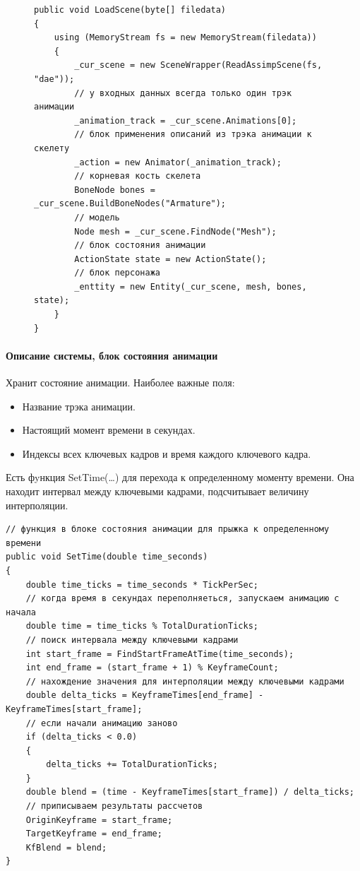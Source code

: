 \begin{scriptsize}
\begin{figure}
\begin{verbatim}
public void LoadScene(byte[] filedata)
{
    using (MemoryStream fs = new MemoryStream(filedata))
    {
        _cur_scene = new SceneWrapper(ReadAssimpScene(fs, "dae"));
        // у входных данных всегда только один трэк анимации
        _animation_track = _cur_scene.Animations[0];
        // блок применения описаний из трэка анимации к скелету
        _action = new Animator(_animation_track);
        // корневая кость скелета
        BoneNode bones = _cur_scene.BuildBoneNodes("Armature");
        // модель
        Node mesh = _cur_scene.FindNode("Mesh");
        // блок состояния анимации
        ActionState state = new ActionState();
        // блок персонажа
        _enttity = new Entity(_cur_scene, mesh, bones, state);
    }
}
\end{verbatim}
\end{figure}
\end{scriptsize}


\paragraph{Описание системы, блок состояния анимации}
Хранит состояние анимации. Наиболее важные поля:
\begin{itemize}
\item Название трэка анимации.
\item Настоящий момент времени в секундах.
\item Индексы всех ключевых кадров и время каждого ключевого кадра.
\end{itemize}

Есть фyнкция SetTime(\dots) для перехода к определенному моменту времени. Она находит интервал между ключевыми кадрами, подсчитывает величину интерполяции.

\begin{verbatim}
// функция в блоке состояния анимации для прыжка к определенному времени
public void SetTime(double time_seconds)
{            
    double time_ticks = time_seconds * TickPerSec;
    // когда время в секундах переполняеться, запускаем анимацию с начала
    double time = time_ticks % TotalDurationTicks;
    // поиск интервала между ключевыми кадрами
    int start_frame = FindStartFrameAtTime(time_seconds);
    int end_frame = (start_frame + 1) % KeyframeCount;
    // нахождение значения для интерполяции между ключевыми кадрами
    double delta_ticks = KeyframeTimes[end_frame] - KeyframeTimes[start_frame];
    // если начали анимацию заново
    if (delta_ticks < 0.0)
    {
        delta_ticks += TotalDurationTicks;
    }
    double blend = (time - KeyframeTimes[start_frame]) / delta_ticks;
    // приписываем результаты рассчетов
    OriginKeyframe = start_frame;
    TargetKeyframe = end_frame;
    KfBlend = blend;
}
\end{verbatim}



